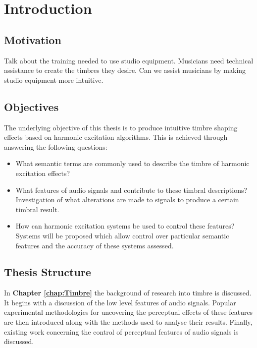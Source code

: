 \chapter{Introduction}
\label{chap:Introduction}

\section{Motivation}
\label{sec:Introduction-Motivation}
	\note
	{
		Talk about the training needed to use studio equipment. Musicians need technical assistance to create the
		timbres they desire. Can we assist musicians by making studio equipment more intuitive.
	}

\section{Objectives}
\label{sec:Introduction-Objectives}
	The underlying objective of this thesis is to produce intuitive timbre shaping effects based on harmonic excitation
	algorithms. This is achieved through answering the following questions:

	\begin{itemize}
		\item What semantic terms are commonly used to describe the timbre of harmonic excitation effects? 
		\item What features of audio signals and contribute to these timbral descriptions? Investigation of what
		      alterations are made to signals to produce a certain timbral result.
		\item How can harmonic excitation systems be used to control these features? Systems will be proposed which
		      allow control over particular semantic features and the accuracy of these systems assessed.
	\end{itemize}

\section{Thesis Structure}
\label{sec:Introduction-ThesisStructure}
	In {\bf{Chapter \ref{chap:Timbre}}} the background of research into timbre is discussed. It begins with a discussion
	of the low level features of audio signals. Popular experimental methodologies for uncovering the perceptual effects
	of these features are then introduced along with the methods used to analyse their results. Finally, existing work
	concerning the control of perceptual features of audio signals is discussed.

